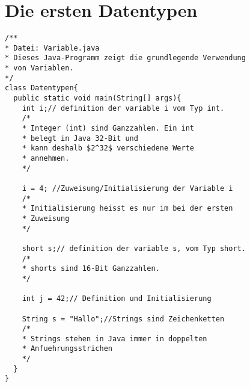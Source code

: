 \documentclass[12pt,a4paper]{../summary}
\begin{document}
\section{Die ersten Datentypen}
\begin{lstlisting}[captionpos=b,caption={Die standart Datentypen von Java},label={datentypen}]
/**
* Datei: Variable.java
* Dieses Java-Programm zeigt die grundlegende Verwendung
* von Variablen.
*/
class Datentypen{
  public static void main(String[] args){
    int i;// definition der variable i vom Typ int.
    /*
    * Integer (int) sind Ganzzahlen. Ein int  
    * belegt in Java 32-Bit und
    * kann deshalb $2^32$ verschiedene Werte 
    * annehmen.
    */
    
    i = 4; //Zuweisung/Initialisierung der Variable i
    /*
    * Initialisierung heisst es nur im bei der ersten
    * Zuweisung
    */
    
    short s;// definition der variable s, vom Typ short.
    /*
    * shorts sind 16-Bit Ganzzahlen.
    */
    
    int j = 42;// Definition und Initialisierung 
    
    String s = "Hallo";//Strings sind Zeichenketten
	/*
	* Strings stehen in Java immer in doppelten 
	* Anfuehrungsstrichen
	*/
  }  
}
\end{lstlisting}
\end{document}
